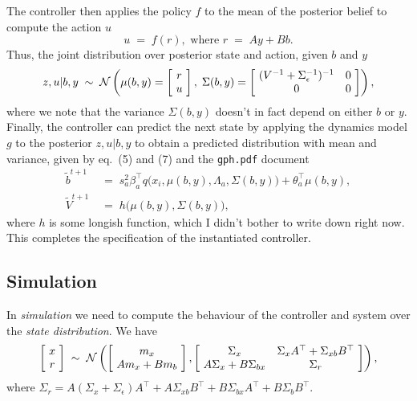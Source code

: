 \documentclass{article}
\begin{document}
The controller then applies the policy $f$ to the mean of the
posterior belief to compute the action $u$
\begin{equation}
u\;=\;f(r),\text{\ \ where\ \ } r\;=\;Ay+Bb.
\end{equation}
Thus, the joint distribution over posterior state and action, given
$b$ and $y$
\begin{equation}
z,u|b,y\;\sim\;{\cal N}\left(\mu(b,y)=\left[\!\begin{array}{c}r\\ u\end{array}\!\right],\;
\Sigma(b,y)=\left[\!\begin{array}{cc}(V^{-1}+\Sigma_\epsilon^{-1})^{-1}&0\\0&0\end{array}
\!\right]\right),
\end{equation}
where we note that the variance $\Sigma(b,y)$ doesn't in fact depend
on either $b$ or $y$. Finally, the controller can predict the next state by applying the  
dynamics model $g$ to the posterior $z,u|b,y$ to obtain a predicted  
distribution with mean and variance, given by eq.~(5) and (7) and the
\texttt{gph.pdf} document
\begin{equation}
\begin{split}
\tilde b^{t+1}&\;=\;s_a^2\beta_a^\top q\big(x_i,\mu(b,y),\Lambda_a,\Sigma(b,y)\big) 
+\theta_a^\top\mu(b,y),\\
\tilde V^{t+1}&\;=\;h\big(\mu(b,y),\Sigma(b,y)\big),
\end{split}
\end{equation}
where $h$ is some longish function, which I didn't bother to write
down right now. This completes the specification of the instantiated
controller.

\subsection*{Simulation}

In \emph{simulation} we need to compute the behaviour of the
controller and system over the \emph{state distribution}. We have
\begin{equation}
\left[\!\begin{array}{c}x\\ r\end{array}\!\right]\;\sim\;{\cal
  N}\left(\left[\!\begin{array}{c}m_x\\  Am_x+Bm_b\end{array}\!\right],
\left[\!\begin{array}{cc}\Sigma_x&\Sigma_xA^\top+\Sigma_{xb}B^\top\\
A\Sigma_x+B\Sigma_{bx}&\Sigma_r\end{array}
\!\right]\right),
\end{equation}
where $\Sigma_r=
A(\Sigma_x+\Sigma_\epsilon)A^\top+A\Sigma_{xb}B^\top+B\Sigma_{bx}A^\top+B\Sigma_bB^\top$.
\end{document}
